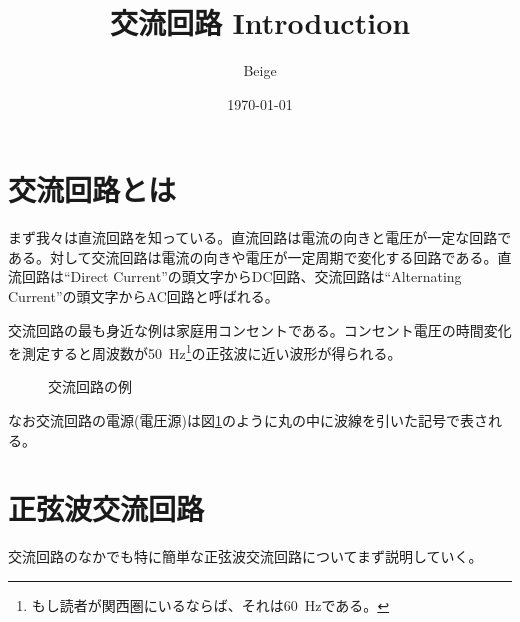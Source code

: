 \documentclass[fontsize=10.5pt]{jlreq}
\begin{document}
\title{交流回路 Introduction}
\author{Beige}
\date{\today}
\maketitle
\tableofcontents
\clearpage
\section{交流回路とは}
まず我々は直流回路を知っている。直流回路は電流の向きと電圧が一定な回路である。対して交流回路は電流の向きや電圧が一定周期で変化する回路である。直流回路は``Direct Current''の頭文字からDC回路、交流回路は``Alternating Current''の頭文字からAC回路と呼ばれる。

交流回路の最も身近な例は家庭用コンセントである。コンセント電圧の時間変化を測定すると周波数が\qty{50}{Hz}\footnote{もし読者が関西圏にいるならば、それは\qty{60}{Hz}である。}の正弦波に近い波形が得られる。
\begin{figure}
    \centering
    \begin{minipage}{0.48\linewidth}
        \centering
        \caption{直流回路の例}
        \label{fig.直流回路の例}
    \end{minipage}
    \begin{minipage}{0.48\linewidth}
        \centering
        \caption{交流回路の例}
        \label{fig.交流回路の例}
    \end{minipage}
\end{figure}

なお交流回路の電源(電圧源)は図\ref{fig.交流回路の例}のように丸の中に波線を引いた記号で表される。
\section{正弦波交流回路}
交流回路のなかでも特に簡単な正弦波交流回路についてまず説明していく。
\end{document}
